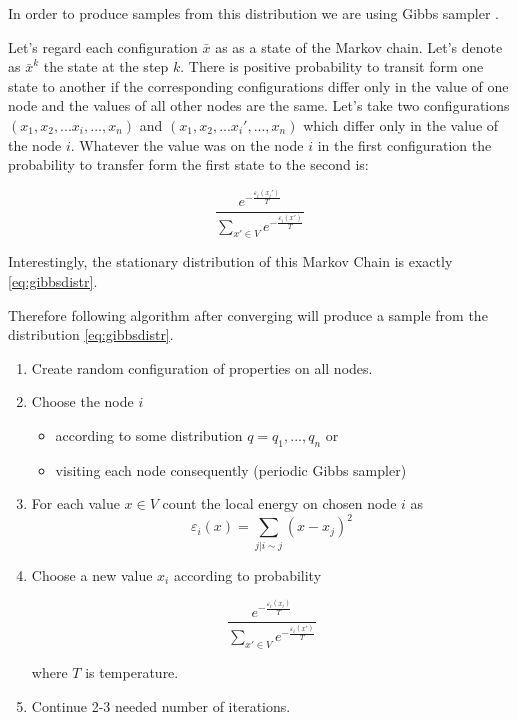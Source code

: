 \documentclass[12pt]{report}
\begin{document}
In order to produce samples from this distribution we are using Gibbs sampler \cite{bremaud2013markov}. 

Let's regard each configuration $\bar{x}$ as as a state of the Markov chain. Let's denote as $ \bar{x}^k $ the state at the step $k$. There is positive probability to transit form one state to another if the corresponding configurations differ only in the value of one node and the values of all other nodes are the same. Let's take two configurations $(x_1, x_2, ... x_i, ..., x_n)$ and $(x_1, x_2, ... x_i', ..., x_n)$ which differ only in the value of the node $i$. Whatever the value was on the node $i$ in the first configuration the probability to transfer form the first state to the second is:

$$\frac{ e^{-\frac{\varepsilon_i(x_i')}{T}} }{ \sum\limits_{x'\in V} e^{-\frac{\varepsilon_i(x')}{T}}} $$

Interestingly, the stationary distribution of this Markov Chain is exactly \ref{eq:gibbsdistr}.

Therefore following algorithm after converging will produce a sample from the distribution \ref{eq:gibbsdistr}.

\begin{enumerate}
  \item Create random configuration of properties on all nodes.
  \item Choose the node $i$
  
 	 \begin{itemize}
		\item according to some distribution $q = q_1, ..., q_n$ or
		\item visiting each node consequently (periodic Gibbs sampler)
 	 \end{itemize}
  
  \item For each value $x \in V$ count the local energy on chosen node $i$ as 
  $$ \varepsilon_i(x) = \sum\limits_{j | i \sim j}  (x - x_j)^2 $$  
  
  \item Choose a new value $x_i$ according to probability
  
  \begin{equation}
 	 \frac{ e^{-\frac{\varepsilon_i(x_i)}{T}} }{ \sum\limits_{x'\in V} e^{-\frac{\varepsilon_i(x')}{T}}} 
 \label{eq:distrNode}
  \end{equation}
  
  
  
	where $T$ is temperature.
\item Continue 2-3 needed number of iterations.
\end{enumerate}
\end{document}
